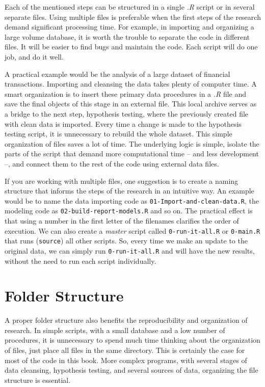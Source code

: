\documentclass[
  12pt,
]{book}
\begin{document}
Each of the mentioned steps can be structured in a single \emph{.R} script or in several separate files. Using multiple files is preferable when the first steps of the research demand significant processing time. For example, in importing and organizing a large volume database, it is worth the trouble to separate the code in different files. It will be easier to find bugs and maintain the code. Each script will do one job, and do it well.

A practical example would be the analysis of a large dataset of financial transactions. Importing and cleansing the data takes plenty of computer time. A smart organization is to insert these primary data procedures in a \emph{.R} file and save the final objects of this stage in an external file. This local archive serves as a bridge to the next step, hypothesis testing, where the previously created file with clean data is imported. Every time a change is made to the hypothesis testing script, it is unnecessary to rebuild the whole dataset. This simple organization of files saves a lot of time. The underlying logic is simple, isolate the parts of the script that demand more computational time -- and less development --, and connect them to the rest of the code using external data files.

If you are working with multiple files, one suggestion is to create a naming structure that informs the steps of the research in an intuitive way. An example would be to name the data importing code as \texttt{01-Import-and-clean-data.R}, the modeling code as \texttt{02-build-report-models.R} and so on. The practical effect is that using a number in the first letter of the filenames clarifies the order of execution. We can also create a \emph{master} script called \texttt{0-run-it-all.R} or \texttt{0-main.R} that runs (\texttt{source}) all other scripts. So, every time we make an update to the original data, we can simply run \texttt{0-run-it-all.R} and will have the new results, without the need to run each script individually.

\hypertarget{directories}{%
\section{Folder Structure}\label{directories}}

A proper folder structure also benefits the reproducibility and organization of research. In simple scripts, with a small database and a low number of procedures, it is unnecessary to spend much time thinking about the organization of files, just place all files in the same directory. This is certainly the case for most of the code in this book. More complex programs, with several stages of data cleansing, hypothesis testing, and several sources of data, organizing the file structure is essential. 
\end{document}
